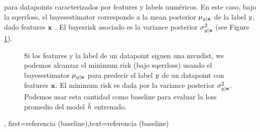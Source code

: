 {{para \gls{datapoint}s caracterizados por \gls{feature}s y \gls{label}s numéricos.
En este caso, bajo la \gls{sqerrloss}, el \gls{bayesestimator} corresponde a la \gls{mean} posterior
$\mu_{y|{\bf x}}$ de la \gls{label} $y$, dado  
\gls{feature}s ${\bf x}$ \cite{LC,GrayProbBook}. El \gls{bayesrisk} asociado es la 
\gls{variance} posterior
$\sigma^{2}_{y|{\bf x}}$ (see Figure \ref{fig_post_baseline_dict}).
	\begin{figure}[H]
		\begin{center}
		\end{center}
		\caption{Si los \gls{feature}s y la  \gls{label} de un \gls{datapoint} siguen una \gls{mvndist}, we 
		podemos alcanzar el \gls{minimum} \gls{risk} (bajo \gls{sqerrloss}) usando el \gls{bayesestimator} $\mu_{y|{\bf x}}$ 
		para predecir el \gls{label} $y$ de un \gls{datapoint} con \gls{feature}s ${\bf x}$. El
		\gls{minimum} \gls{risk} es dada por la \gls{variance} posterior $\sigma^{2}_{y|{\bf x}}$. Podemos 
		usar esta cantidad como baseline para evaluar la \gls{loss} promedio del \gls{model} $\hat{h}$ entrenado. \label{fig_post_baseline_dict}}
	\end{figure}},
    first={referencia (baseline)},text={referencia (baseline)}
}

